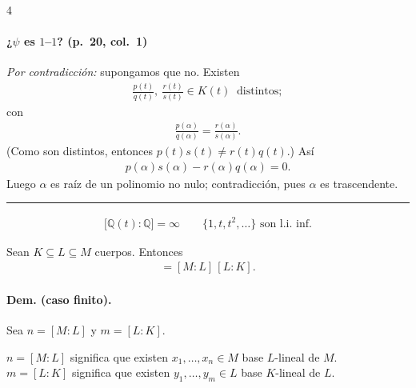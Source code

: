 \documentclass[landscape,a4paper]{article}
\begin{document}
\begin{multicols}{4}
\paragraph{¿$\psi$ es $1$–$1$? (p.~20, col.~1)}
\emph{Por contradicción:} supongamos que no. Existen
\begin{align*}
  \frac{p(t)}{q(t)},\ \frac{r(t)}{s(t)} \in K(t)\;\;\text{distintos};
\end{align*}
con
\begin{align*}
  \frac{p(\alpha)}{q(\alpha)} = \frac{r(\alpha)}{s(\alpha)}.
\end{align*}
(Como son distintos, entonces $p(t)s(t) \neq r(t)q(t)$.) Así
\begin{align*}
  p(\alpha)s(\alpha) - r(\alpha)q(\alpha) = 0.
\end{align*}
Luego $\alpha$ es raíz de un polinomio no nulo; contradicción, pues $\alpha$ es trascendente.\par
\noindent\rule{\linewidth}{0.3pt}
\begin{align*}
  \bigl[\mathbb{Q}(t):\mathbb{Q}\bigr] = \infty \qquad \{1,t,t^{2},\dots\}\text{ son l.i. inf.}
\end{align*}
\begin{tcolorbox}[colback=white,colframe=red!80!black,colbacktitle=red!80!black,coltitle=white,title={Teorema de la Torre (p.~20, col.~2)}]
Sean $K \subseteq L \subseteq M$ cuerpos. Entonces
\begin{align*}
  [M:K] = [M:L]\,[L:K].
\end{align*}
\end{tcolorbox}
\paragraph{Dem. (caso finito).} Sea $n=[M:L]$ y $m=[L:K]$.\par

$n=[M:L]$ significa que existen $x_1,\dots,x_n\in M$ base $L$-lineal de $M$.\\
$m=[L:K]$ significa que existen $y_1,\dots,y_m\in L$ base $K$-lineal de $L$.\\


\end{multicols}
\end{document}
